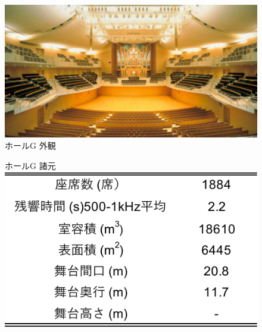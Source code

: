 \documentclass[11pt,a4j]{jreport}
\begin{document}
  \begin{figure}[H]
    \begin{minipage}{0.5\textwidth} %
      \centering

      \includegraphics[width=.8\linewidth]{images/measuredHalls/resized/picture_g.jpg}
      \\ホールG 外観
      \vspace{2\baselineskip}

      ホールG 諸元\\
      \includegraphics[width=.8\linewidth]{images/measuredHalls/informationTable/g.pdf}
      \vspace{2\baselineskip}


\end{minipage}
\end{figure}
\end{document}

